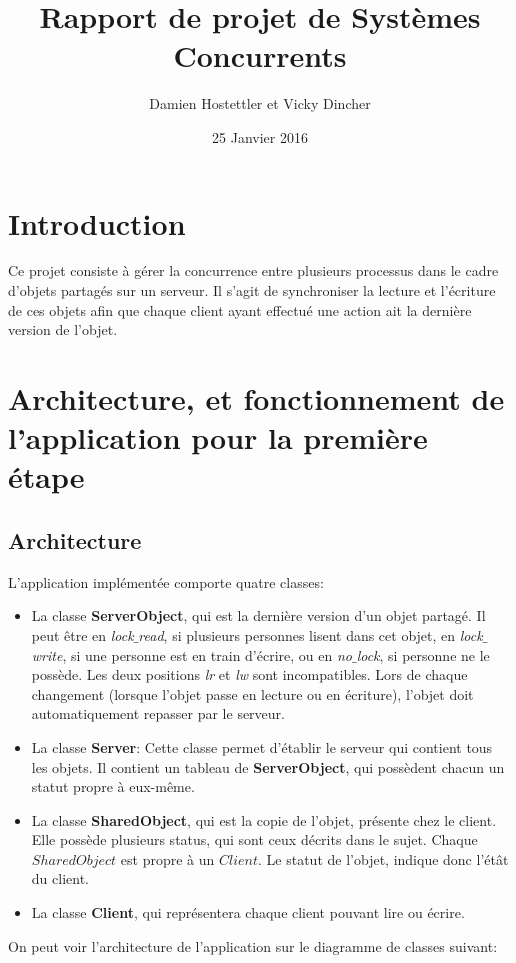 \documentclass[11pt,a4paper]{report}
\author{Damien Hostettler et Vicky Dincher}
\title{Rapport de projet de Systèmes Concurrents}
\date{25 Janvier 2016}
\begin{document}
\maketitle
\tableofcontents
\newpage
 
\section*{Introduction}

Ce projet consiste à gérer la concurrence entre plusieurs processus dans le cadre d'objets partagés sur un serveur. Il s'agit de synchroniser la lecture et l'écriture de ces objets afin que chaque client ayant effectué une action ait la dernière version de l'objet. 

\section{Architecture, et fonctionnement de l'application pour la première étape}

\subsection{Architecture}

L'application implémentée comporte quatre classes:
\begin{itemize}
\item La classe \textbf{ServerObject}, qui est la dernière version d'un objet partagé. Il peut être en \textit{lock$\_$read}, si plusieurs personnes lisent dans cet objet,  en \textit{lock$\_$write}, si une personne est en train d'écrire, ou en \textit{no$\_$lock}, si personne ne le possède. Les deux positions \textit{lr} et \textit{lw} sont incompatibles. Lors de chaque changement (lorsque l'objet passe en lecture ou en écriture), l'objet doit automatiquement repasser par le serveur.
\item La classe \textbf{Server}: Cette classe permet d'établir le serveur qui contient tous les objets. Il contient un tableau de \textbf{ServerObject}, qui possèdent chacun un statut propre à eux-même. 
\item La classe \textbf{SharedObject}, qui est la copie de l'objet, présente chez le client. Elle possède plusieurs status, qui sont ceux décrits dans le sujet. Chaque $SharedObject$ est propre à un $Client$. Le statut de l'objet, indique donc l'étât du client.
\item La classe \textbf{Client}, qui représentera chaque client pouvant lire ou écrire.
\end{itemize}
On peut voir l'architecture de l'application sur le diagramme de classes suivant:
\end{document}
